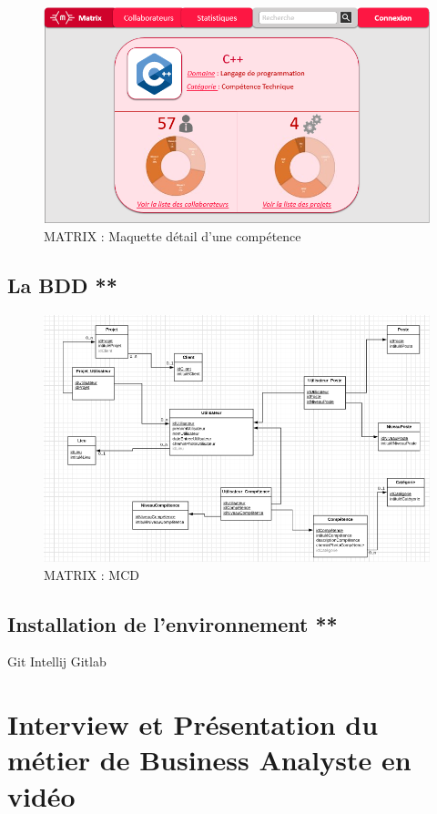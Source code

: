 \begin{figure}[!h]
\centering
\includegraphics[width=1\textwidth]{images/matrix-maquette-competence.png}
\caption{MATRIX : Maquette détail d'une compétence}
\end{figure}

\subsection{La BDD **}

\begin{figure}[!h]
\centering
\includegraphics[width=1\textwidth]{images/matrix-bdd.png}
\caption{MATRIX : MCD}
\end{figure}

\subsection{Installation de l’environnement **}

Git Intellij Gitlab

\section{Interview et Présentation du métier de Business Analyste en vidéo}

